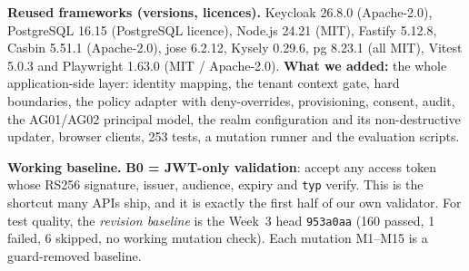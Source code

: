 \documentclass[11pt]{article}
\newcommand{\code}[1]{\texttt{\small #1}}
\begin{document}
\textbf{Reused frameworks (versions, licences).} Keycloak 26.8.0 (Apache-2.0), PostgreSQL 16.15 (PostgreSQL licence), Node.js 24.21 (MIT), Fastify 5.12.8, Casbin 5.51.1 (Apache-2.0), jose 6.2.12, Kysely 0.29.6, pg 8.23.1 (all MIT), Vitest 5.0.3 and Playwright 1.63.0 (MIT / Apache-2.0). \textbf{What we added:} the whole application-side layer: identity mapping, the tenant context gate, hard boundaries, the policy adapter with deny-overrides, provisioning, consent, audit, the AG01/AG02 principal model, the realm configuration and its non-destructive updater, browser clients, 253 tests, a mutation runner and the evaluation scripts.

\textbf{Working baseline.} \textbf{B0 = JWT-only validation}: accept any access token whose RS256 signature, issuer, audience, expiry and \code{typ} verify. This is the shortcut many APIs ship, and it is exactly the first half of our own validator. For test quality, the \emph{revision baseline} is the Week~3 head \texttt{953a0aa} (160 passed, 1 failed, 6 skipped, no working mutation check). Each mutation M1--M15 is a guard-removed baseline.

\end{document}
